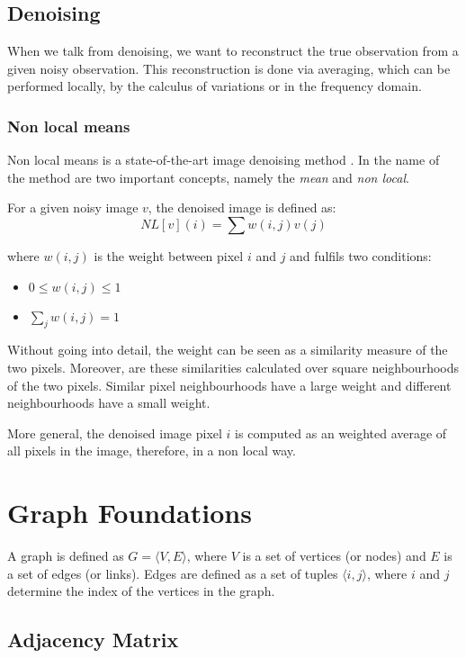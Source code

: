 \subsection{Denoising}
When we talk from denoising, we want to reconstruct the true observation 
from a given noisy observation. This reconstruction is done via averaging, which can be performed
locally, by the calculus of variations or in the frequency domain.

\subsubsection{Non local means}
Non local means is a state-of-the-art image denoising method \cite{noneLocalMean}.
In the name of the method are two important concepts, namely the \textit{mean}
and \textit{non local}.

For a given noisy image $v$, the denoised image is defined as:
\begin{equation}
    NL[v](i) = \sum{w(i,j)v(j)}
\end{equation}

where $w(i,j)$ is the weight between pixel $i$ and $j$ and fulfils two conditions:
\begin{itemize}
    \item $0 \le w(i,j) \le 1$
    \item $\sum_j{w(i,j) = 1}$
\end{itemize}

Without going into detail, the weight can be seen as a similarity measure of the two pixels.
Moreover, are these similarities calculated over square neighbourhoods of the two pixels.
Similar pixel neighbourhoods have a large weight and different neighbourhoods have a small weight.

More general, the denoised image pixel $i$ is computed 
as an weighted average of all pixels in the image, therefore, in a non local way.

\section{Graph Foundations}
A graph is defined as  $G = \langle V,E \rangle$, where $V$ is a set of 
vertices (or nodes) and $E$ is a set of edges (or links). Edges are 
defined as a set of tuples $\langle i,j \rangle$, where $i$ and $j$ determine the 
index of the vertices in the graph.

\subsection{Adjacency Matrix}

